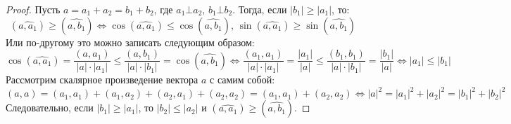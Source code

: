 \documentclass[12pt]{article}
\theoremstyle{definition}
\begin{document}
\begin{proof}
	Пусть $a = a_1 + a_2 = b_1 + b_2$, где $a_1 \bot a_2, \, b_1 \bot b_2$. Тогда, если $|b_1| \geq |a_1|$, то: 
	$$
		(\widehat{a,a_1}) \geq (\widehat{a,b_1}) \Leftrightarrow \cos(\widehat{a,a_1}) \leq \cos(\widehat{a,b_1}), \, \sin(\widehat{a,a_1}) \geq \sin(\widehat{a,b_1})
	$$
	Или по-другому это можно записать следующим образом:
	$$
		\cos(\widehat{a,a_1}) = \dfrac{(a,a_1)}{|a|{\cdot}|a_1|} \leq \dfrac{(a,b_1)}{|a|{\cdot}|b_1|} = \cos(\widehat{a,b_1}) \Leftrightarrow \dfrac{(a_1, a_1)}{|a|{\cdot}|a_1|} = \dfrac{|a_1|}{|a|} \leq \dfrac{(b_1,b_1)}{|a|{\cdot}|b_1|} = \dfrac{|b_1|}{|a|} \Leftrightarrow |a_1| \leq |b_1|
	$$
	Рассмотрим скалярное произведение вектора $a$ с самим собой:
	$$
		(a,a) = (a_1,a_1) + (a_1,a_2) + (a_2,a_1) + (a_2, a_2) = (a_1, a_1) + (a_2, a_2) \Leftrightarrow |a|^2 = |a_1|^2 + |a_2|^2 = |b_1|^2 + |b_2|^2
	$$
	Следовательно, если $|b_1| \geq |a_1|$, то $|b_2| \leq |a_2|$ и $(\widehat{a,a_1}) \geq (\widehat{a,b_1})$. 
	

\end{proof}
\end{document}
